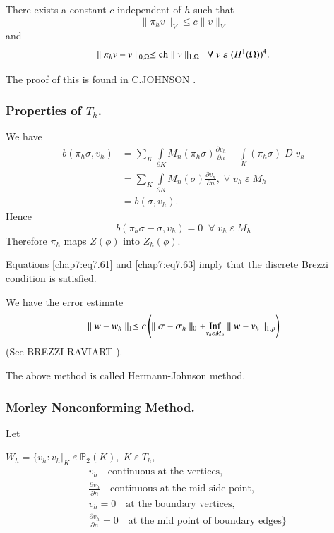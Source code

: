 \begin{THM}\label{chap7:THM12}
There exists a constant $c$ independent of $h$ such that 
\begin{equation}\label{chap7:eq7.61}
\parallel\pi_hv\parallel_V\leq c\parallel v\parallel_V
\end{equation}
and 
\begin{equation}\label{chap7:eq7.62}
\parallel\pi_hv-v\parallel_{0,\Omega}\leq\operatorname{ch}\parallel v
\parallel_{1.\Omega}\; \; \forall \;v\;\varepsilon \;(H^1(\Omega))^4.
\end{equation}

The proof of this is found in C.JOHNSON \cite{key24}.
\end{THM}

\subsubsection{\bf Properties of $T_h$.} We have 
\begin{align*}
b(\pi_h\sigma,v_h) &= \sum\limits_K\int\limits_{\partial K}M_n
(\pi_h\sigma)\frac{\partial v_h}{\partial n}- \int\limits_K
(\pi_h\sigma)\;D\;v_h\\
&= \sum\limits_K\int\limits_{\partial K}M_n(\sigma) \frac{\partial
v_h}{\partial n},\;\forall \;v_h \;\varepsilon \;M_h\\
&= b(\sigma, v_h).
\end{align*}
Hence\pageoriginale
\begin{equation}\label{chap7:eq7.63}
b(\pi_h\sigma -\sigma,v_h)=0\; \;\forall \;v_h\;\varepsilon \;M_h 
\end{equation}
Therefore $\pi_h$ maps $Z(\phi)$ into $Z_h(\phi)$.

Equations \eqref{chap7:eq7.61} and \eqref{chap7:eq7.63} imply that the
discrete Brezzi condition is satisfied.

We have the error estimate
$$
\parallel w-w_h\parallel_1\leq c\left(\parallel\sigma-
\sigma_h\parallel_0+\underset{v_h\varepsilon M_h}{\operatorname{Inf}}\parallel
w-v_h\parallel_{1,p}\right) 
$$
(See BREZZI-RAVIART \cite{key7}).

The above method is called Hermann-Johnson method.

\subsubsection{\bf Morley Nonconforming Method.} Let 

$W_h=\{v_h:v_h|_K\;\varepsilon \;\mathbb{P}_2(K),\;K\;\varepsilon
\;T_h$,
\begin{align*}
&v_h\quad\text{continuous at the vertices},\\
&\frac{\partial v_h}{\partial n}\quad\text{continuous at the mid side
point},\\
&v_h=0\quad\text{at the boundary vertices},\\
&\frac{\partial v_h}{\partial n}=0\quad\text{at the mid point of
boundary edges}\}
\end{align*}

